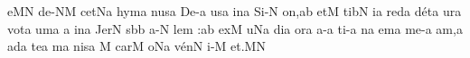 \nosolesmescustos
{}\Internote
{}
\initiumgregorianum
{}%
e{}\pes MN\egn
\spatium
\sgn d{e}-\clivis NM\egn
\sgn cet\pes Na\egn
\spatium
\sgn h{y}m\punctum a\egn
\sgn nus\punctum a\egn
\spatium
\sgn D{e}-\punctum a\egn
\sgn {}us\punctum a\egn
\spatium
\sgn {}in\punctum a\egn
\spatium
\sgn S{i}-\punctum N\egn
\sgn {}o{n,}\punctum a\augmentum b\egn
\spatium
\divisiominor
\spatium
\sgn {}et\punctum M\egn
\spatium
\sgn t{i}b\punctum N\egn
\sgn {}i{}\punctum a\egn
\spatium
\sgn red\punctum a\egn
\sgn d{\'e}t\punctum a\egn
\sgn {}ur\punctum a\egn
\spatium
\sgn v{o}t\punctum a\egn
\sgn {}um\punctum a\egn
\spatium
\custos a
\lineaproxima
\sgn {}in\punctum a\egn
\spatium
\sgn Jer\punctum N\egn
{}s\bmolle b\punctum b\egn
\sgn {}a-\punctum N\egn
\sgn le{m :}\punctum a\augmentum b\egn
\spatium
\Asteriscus
\divisiomaior
\spatium
\sgn {}ex\punctum M\egn
{}u\epiphonus Na\egn
\sgn di{}\punctum a\egn
\spatium
\sgn {}or\punctum a\egn
\sgn {}a-\punctum a\egn
\sgn ti-\punctum a\egn
{}n\punctum a\egn
\sgn {}em\punctum a\egn
\spatium
\sgn m{e}-\punctum a\egn
\sgn {}a{m,}\punctum a\egn
\spatium
\divisiominor
\spatium
\sgn {}ad\punctum a\egn
\spatium
\sgn te{}\punctum a\egn
\spatium
{}m\punctum a\egn
\sgn nis\punctum a\egn
\spatium
\custos M
\lineaproxima
\sgn c{a}r\punctum M\egn
\sgn {}o{}\pes Na\egn
\spatium
\sgn v{\'e}n\punctum N\egn
\sgn {}i-\punctum M\egn
\sgn {}e{t.}\punctum M\augmentum N\egn
\spatium
\Finisgregoriana







